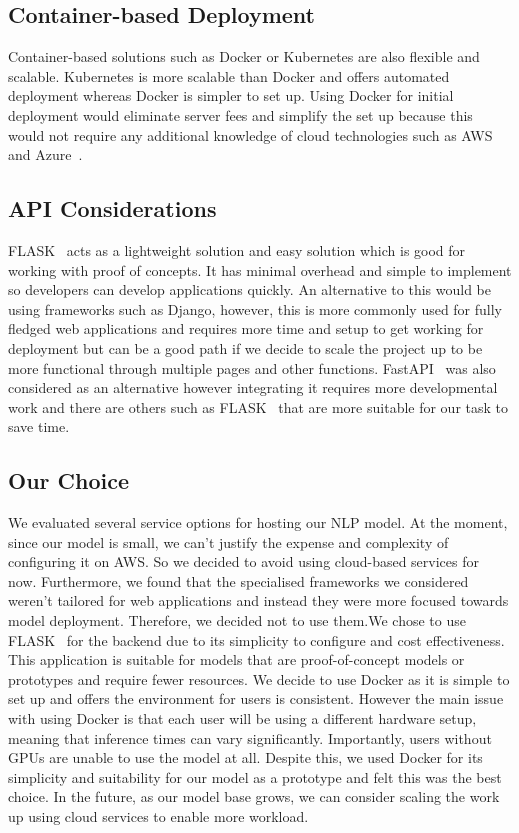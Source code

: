 \documentclass{surreydissertation}
\begin{document}
\subsection{Container-based Deployment}
Container-based solutions such as Docker or Kubernetes are also flexible and scalable. Kubernetes is more scalable than Docker and offers automated deployment whereas Docker is simpler to set up. Using Docker for initial deployment would eliminate server fees and simplify the set up because this would not require any additional knowledge of cloud technologies such as AWS~\cite{AWSSageMaker} and Azure~\cite{azure}.

\subsection{API Considerations}
FLASK~\cite{flask} acts as a lightweight solution and easy solution which is good for working with proof of concepts. It has minimal overhead and simple to implement so developers can develop applications quickly. An alternative to this would be using frameworks such as Django, however, this is more commonly used for fully fledged web applications and requires more time and setup to get working for deployment but can be a good path if we decide to scale the project up to be more functional through multiple pages and other functions. FastAPI~\cite{fastapi} was also considered as an alternative however integrating it requires more developmental work and there are others such as FLASK~\cite{flask} that are more suitable for our task to save time.

\subsection{Our Choice}
We evaluated several service options for hosting our NLP model. At the moment, since our model is small, we can't justify the expense and complexity of configuring it on AWS. So we decided to avoid using cloud-based services for now. Furthermore, we found that the specialised frameworks we considered weren't tailored for web applications and instead they were more focused towards model deployment. Therefore, we decided not to use them.We chose to use FLASK~\cite{flask} for the backend due to its simplicity to configure and cost effectiveness. This application is suitable for models that are proof-of-concept models or prototypes and require fewer resources. We decide to use Docker as it is simple to set up and offers the environment for users is consistent. However the main issue with using Docker is that each user will be using a different hardware setup, meaning that inference times can vary significantly. Importantly, users without GPUs are unable to use the model at all. Despite this, we used Docker for its simplicity and suitability for our model as a prototype and felt this was the best choice. In the future, as our model base grows, we can consider scaling the work up using cloud services to enable more workload. 
\end{document}
